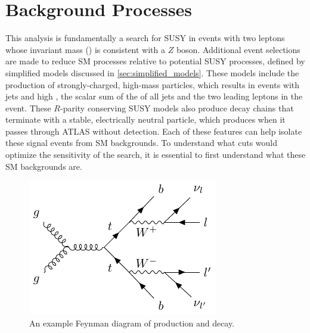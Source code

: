 
\chapter{Background Processes} %

\label{ch:background_processes} 


This analysis is fundamentally a search for \ac{SUSY} in events with two leptons whose invariant mass (\mll) is consistent with a $Z$ boson. Additional event selections are made to reduce \ac{SM} processes relative to potential \ac{SUSY} processes, defined by simplified models discussed in \autoref{sec:simplified_models}. These models include the production of strongly-charged, high-mass particles, which results in events with jets and high \HT, the scalar sum of the \pt of all jets and the two leading leptons in the event. These $R$-parity conserving \ac{SUSY} models also produce decay chains that terminate with a stable, electrically neutral particle, which produces \MET when it passes through \ac{ATLAS} without detection. Each of these features can help isolate these signal events from \ac{SM} backgrounds. To understand what cuts would optimize the sensitivity of the search, it is essential to first understand what these \ac{SM} backgrounds are. 

\begin{centering}
\begin{figure}[bth]
\myfloatalign
\includegraphics[width=.70\linewidth]{feynman/ttbar.pdf}
\caption{An example Feynman diagram of \ttbar production and decay.}
\label{fig:ttbar}
\end{figure}
\end{centering}


